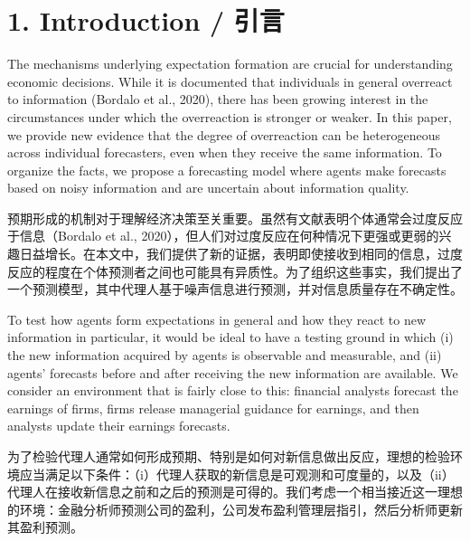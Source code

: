 \documentclass[12pt,a4paper]{article}
\newenvironment{original}
  {\par\medskip\noindent\ignorespaces}
  {\par\medskip}
\newenvironment{translation}
  {\par\noindent{\color{transblue}\ignorespaces}}
  {\par\bigskip}
\begin{document}
\section{1. Introduction / 引言}

\begin{original}
The mechanisms underlying expectation formation are crucial for understanding economic decisions. While it is documented that individuals in general overreact to information (Bordalo et al., 2020), there has been growing interest in the circumstances under which the overreaction is stronger or weaker. In this paper, we provide new evidence that the degree of overreaction can be heterogeneous across individual forecasters, even when they receive the same information. To organize the facts, we propose a forecasting model where agents make forecasts based on noisy information and are uncertain about information quality.
\end{original}
\begin{translation}
预期形成的机制对于理解经济决策至关重要。虽然有文献表明个体通常会过度反应于信息（Bordalo et al., 2020），但人们对过度反应在何种情况下更强或更弱的兴趣日益增长。在本文中，我们提供了新的证据，表明即使接收到相同的信息，过度反应的程度在个体预测者之间也可能具有异质性。为了组织这些事实，我们提出了一个预测模型，其中代理人基于噪声信息进行预测，并对信息质量存在不确定性。
\end{translation}

\begin{original}
To test how agents form expectations in general and how they react to new information in particular, it would be ideal to have a testing ground in which (i) the new information acquired by agents is observable and measurable, and (ii) agents' forecasts before and after receiving the new information are available. We consider an environment that is fairly close to this: financial analysts forecast the earnings of firms, firms release managerial guidance for earnings, and then analysts update their earnings forecasts.
\end{original}
\begin{translation}
为了检验代理人通常如何形成预期、特别是如何对新信息做出反应，理想的检验环境应当满足以下条件：（i）代理人获取的新信息是可观测和可度量的，以及（ii）代理人在接收新信息之前和之后的预测是可得的。我们考虑一个相当接近这一理想的环境：金融分析师预测公司的盈利，公司发布盈利管理层指引，然后分析师更新其盈利预测。
\end{translation}
\end{document}
